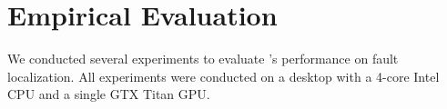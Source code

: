 \section{Empirical Evaluation}

We conducted several experiments to evaluate \tool's performance on fault localization. All experiments were conducted on a desktop with a 4-core Intel CPU and a single GTX Titan GPU.




